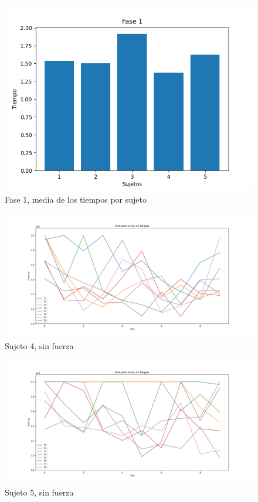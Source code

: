 \documentclass[a4paper,11pt, oneside]{book}
\begin{document}
\begin{figure}[H]
	\includegraphics[width=\linewidth]{fase1-time}
	\caption{Fase 1, media de los tiempos por sujeto}
	\label{fase1-time}
\end{figure}


\begin{figure}[H]
	\includegraphics[width=\linewidth]{sujeto4/no_force/evolution_time}
	\caption{Sujeto 4, sin fuerza}
	\label{4-1-3}
\end{figure}
\begin{figure}[H]
	\includegraphics[width=\linewidth]{sujeto5/no_force/evolution_time}
	\caption{Sujeto 5, sin fuerza}
	\label{5-1-3}
\end{figure}
\end{document}
